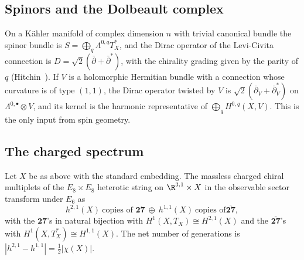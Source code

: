 \subsection{Spinors and the Dolbeault complex}

On a K\"ahler manifold of complex dimension $n$ with trivial canonical
bundle the spinor bundle is $S=\bigoplus_{q}\Lambda^{0,q}T^*_X$, and the
Dirac operator of the Levi-Civita connection is $D=\sqrt2(\bar\partial+
\bar\partial^*)$, with the chirality grading given by the parity of $q$
(Hitchin~\cite{Hit74}). If $V$ is a holomorphic Hermitian bundle with a
connection whose curvature is of type $(1,1)$, the Dirac operator twisted by
$V$ is $\sqrt2(\bar\partial_V+\bar\partial_V^*)$ on $\Lambda^{0,\bullet}
\otimes V$, and its kernel is the harmonic representative of
$\bigoplus_q H^{0,q}(X,V)$. This is the only input from spin geometry.

\subsection{The charged spectrum}

\begin{theorem}\label{thm:dictionary}
Let $X$ be as above with the standard embedding. The massless charged
chiral multiplets of the $E_8\times E_8$ heterotic string on $\R^{3,1}
\times X$ in the observable sector transform under $E_6$ as
\[
h^{2,1}(X)\ \text{copies of }\mathbf{27}\ \oplus\ h^{1,1}(X)\ \text{copies of
}\overline{\mathbf{27}},
\]
with the $\mathbf{27}$'s in natural bijection with $H^1(X,T_X)\cong
H^{2,1}(X)$ and the $\overline{\mathbf{27}}$'s with $H^1(X,T_X^*)\cong
H^{1,1}(X)$. The net number of generations is
$|h^{2,1}-h^{1,1}|=\tfrac12|\chi(X)|$.
\end{theorem}

